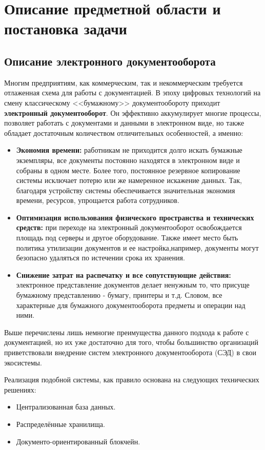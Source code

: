 \chapter{Описание предметной области и постановка задачи} \label{ch:ch1}

\section{Описание электронного документооборота} \label{sec:ch1/sec1}
Многим предприятиям, как коммерческим, так и некоммерческим требуется отлаженная схема для работы с документацией.
В эпоху цифровых технологий на смену классическому <<бумажному>> документообороту приходит \textbf{электронный документооборот}.
Он эффективно аккумулирует многие процессы, позволяет работать с документами и данными в электронном виде, но также обладает достаточным количеством отличительных особенностей, а именно:
 \begin{itemize}
 	\item \textbf{Экономия времени:} работникам не приходится долго искать бумажные экземпляры, все документы постоянно находятся в электронном виде и собраны в одном месте. Более того, постоянное резервное копирование системы исключает потерю или же намеренное искажение данных. Так, благодаря устройству системы обеспечивается значительная экономия времени, ресурсов, упрощается работа сотрудников.
 	\item \textbf{Оптимизация использования физического пространства и технических средств:} при переходе на электронный документооборот освобождается площадь под серверы и другое оборудование. Также имеет место быть политика утилизации документов и ее настройка,например, документы могут безопасно удаляться по истечении срока их хранения.
 	\item \textbf{Снижение затрат на распечатку и все сопутствующие действия:} электронное представление документов делает ненужным то, что присуще бумажному представлению - бумагу, принтеры и т.д. Словом, все характерные для бумажного документооборота предметы и операции над ними.
 \end{itemize}

Выше перечислены лишь немногие преимущества данного подхода к работе с документацией, но их уже достаточно для того, чтобы большинство организаций приветствовали внедрение 	систем электронного документооборота (СЭД) в свои экосистемы.

Реализация подобной системы, как правило основана на следующих технических решениях:
\begin{itemize}
	\item Централизованная база данных.
	\item Распределённые хранилища.
	\item Документо-ориентированный блокчейн.
\end{itemize}

